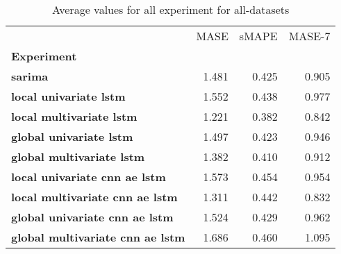 \begin{table}[h]
\centering
\caption{Average values for all experiment for all-datasets}
\label{table:Average-metric-all-datasets}
\begin{tabular}{lrrr}
\toprule
{} &   MASE &  sMAPE &  MASE-7 \\
\textbf{Experiment                     } &        &        &         \\
\midrule
\textbf{sarima                         } &  1.481 &  0.425 &   0.905 \\
\textbf{local univariate lstm          } &  1.552 &  0.438 &   0.977 \\
\textbf{local multivariate lstm        } &  1.221 &  0.382 &   0.842 \\
\textbf{global univariate lstm         } &  1.497 &  0.423 &   0.946 \\
\textbf{global multivariate lstm       } &  1.382 &  0.410 &   0.912 \\
\textbf{local univariate cnn ae lstm   } &  1.573 &  0.454 &   0.954 \\
\textbf{local multivariate cnn ae lstm } &  1.311 &  0.442 &   0.832 \\
\textbf{global univariate cnn ae lstm  } &  1.524 &  0.429 &   0.962 \\
\textbf{global multivariate cnn ae lstm} &  1.686 &  0.460 &   1.095 \\
\bottomrule
\end{tabular}
\end{table}
